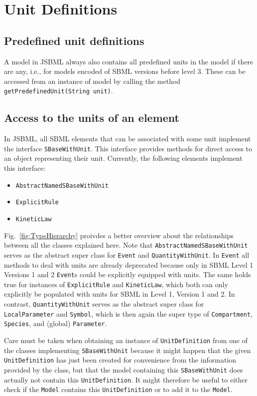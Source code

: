 \documentclass[
  BCOR12mm,
  letterpaper,
  11pt,
  headsepline,
  pointlessnumbers,
  tablecaptionabove,
  headinclude,
  appendixprefix,
  idxtotoc,
  bibtotoc,
  twoside,
  titlepage
]{scrartcl}
\begin{document}
\section{Unit Definitions}

\subsection{Predefined unit definitions}

A model in JSBML always also contains all predefined units in the model
if there are any, i.e., for models encoded of SBML versions before level
3. These can be accessed from an instance of model by calling the method
\verb!getPredefinedUnit(String unit)!.

\subsection{Access to the units of an element}

In JSBML, all SBML elements that can be associated with some unit implement the
interface \verb!SBaseWithUnit!. This interface provides methods for direct
access to an object representing their unit. Currently, the following elements
implement this interface:
\begin{itemize}
 \item \verb!AbstractNamedSBaseWithUnit!
 \item \verb!ExplicitRule!
 \item \verb!KineticLaw!
\end{itemize}
Fig.~\vref{fig:TypeHierarchy} proivdes a better overview about the relationships
between all the classes explained here.
Note that \verb!AbstractNamedSBaseWithUnit! serves as the abstract super class
for \verb!Event! and \verb!QuantityWithUnit!. In \verb!Event! all methods to
deal with units are already deprecated because only in SBML Level 1 Versions 1
and 2 \verb!Event!s could be explicitly equipped with units. The same holds true
for instances of \verb!ExplicitRule! and \verb!KineticLaw!, which both can only
explicitly be populated with units for SBML in Level 1, Version 1 and 2. In
contrast, \verb!QuantityWithUnit! serves as the abstract super class for
\verb!LocalParameter! and \verb!Symbol!, which is then again the super type of
\verb!Compartment!, \verb!Species!, and (global) \verb!Parameter!.

Care must be taken when obtaining an instance of \verb!UnitDefinition! from one
of the classes implementing \verb!SBaseWithUnit!
because it might happen that the given \verb!UnitDefinition! has just been
created for convenience from the information provided by the class, but that the
model containing this \verb!SBaseWithUnit! does actually not contain this
\verb!UnitDefinition!. It might therefore be useful to either check if the
\verb!Model! contains this \verb!UnitDefinition! or to add it to the
\verb!Model!.
\end{document}
